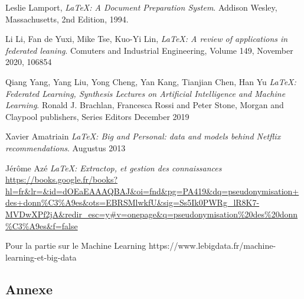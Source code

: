 \documentclass[12pt,a4paper]{report}
\begin{document}
\begin{thebibliography}{9}

	  Leslie Lamport,
	  \emph{\LaTeX: A Document Preparation System}.
	  Addison Wesley, Massachusetts,
	  2nd Edition,
	  1994.
	  
	  Li Li, Fan de Yuxi, Mike Tse, Kuo-Yi Lin,
	  \emph{\LaTeX: A review of applications in federated leaning}.
	  Comuters and Industrial Engineering,
	  Volume 149,
	  November 2020,
	  106854
	  
	  Qiang Yang, Yang Liu, Yong Cheng, Yan Kang, Tianjian Chen, Han Yu
	  \emph{\LaTeX: Federated Learning, Synthesis Lectures on Artificial Intelligence and Machine Learning}.
	  Ronald J. Brachlan, Francesca Rossi and Peter Stone,
	  Morgan and Claypool publishers,
	  Series Editors
	  December 2019
	  
	  Xavier Amatriain
	  \emph{\LaTeX: Big and Personal: data and models behind Netflix recommendations}.
	  Augustus 2013
	  
	  Jérôme Azé
	  \emph{\LaTeX: Extractop, et gestion des connaissances}
	  \url{https://books.google.fr/books?hl=fr&lr=&id=dOEaEAAAQBAJ&oi=fnd&pg=PA419&dq=pseudonymisation+des+donn%C3%A9es&ots=EBRSMlwkfU&sig=Ss5Ik0PWRg_lR8K7-MVDwXPf2jA&redir_esc=y#v=onepage&q=pseudonymisation%20des%20donn%C3%A9es&f=false}
	  
	Pour la partie sur le Machine Learning https://www.lebigdata.fr/machine-learning-et-big-data

\end{thebibliography}


\label{Pour la partie sur le Machine Learning https://www.lebigdata.fr/machine-learning-et-big-data}

\label{TensorFlow : https://www.lebigdata.fr/tensorflow-definition-tout-savoir}

 


\begin{appendix}
 \chapter{Annexe}
 
\end{appendix}
\end{document}

